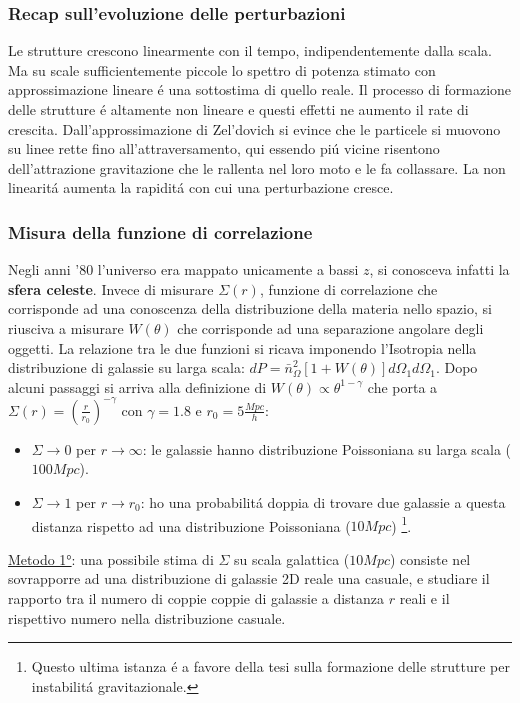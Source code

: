 \documentclass[12pt, a4paper]{article}
\begin{document}
\subsubsection{Recap sull'evoluzione delle perturbazioni}
Le strutture crescono linearmente con il tempo, indipendentemente dalla scala. Ma su scale sufficientemente piccole lo spettro di potenza stimato con approssimazione lineare \'{e} una sottostima di quello reale. Il processo di formazione delle strutture \'{e} altamente non lineare e questi effetti ne aumento il rate di crescita. Dall'approssimazione di Zel'dovich si evince che le particele si muovono su linee rette fino all'attraversamento, qui essendo pi\'{u} vicine risentono dell'attrazione gravitazione che le rallenta nel loro moto e le fa collassare. La non linearit\'{a} aumenta la rapidit\'{a} con cui una perturbazione cresce.
\subsubsection{Misura della funzione di correlazione}
Negli anni '80 l'universo era mappato unicamente a bassi $z$, si conosceva infatti la \textbf{sfera celeste}. Invece di misurare $\Sigma(r)$, funzione di correlazione che corrisponde ad una conoscenza della distribuzione della materia nello spazio, si riusciva a misurare $W(\theta)$ che corrisponde ad una separazione angolare degli oggetti. La relazione tra le due funzioni si ricava imponendo l'Isotropia nella distribuzione di galassie su larga scala: $dP=\bar{n}_{\Omega}^2 [1+W(\theta)] d\Omega_1 d\Omega_1$. Dopo alcuni passaggi si arriva alla definizione di $W(\theta)\propto \theta^{1-\gamma}$ che porta a $\Sigma(r)=(\frac{r}{r_0})^{-\gamma}$ con $\gamma=1.8$ e $r_0=5 \frac{Mpc}{h}$:
\begin{itemize}
\item $\Sigma \rightarrow 0$ per $r\rightarrow \infty$: le galassie hanno distribuzione Poissoniana su larga scala ($100Mpc$).
\item $\Sigma \rightarrow 1$ per $r\rightarrow r_0$: ho una probabilit\'{a} doppia di trovare due galassie a questa distanza rispetto ad una distribuzione Poissoniana ($10Mpc$) \footnote{Questo ultima istanza \'{e} a favore della tesi sulla formazione delle strutture per instabilit\'{a} gravitazionale.}.
\end{itemize}
\underline{Metodo 1°}: una possibile stima di $\Sigma$ su scala galattica ($10Mpc$) consiste nel sovrapporre ad una distribuzione di galassie 2D reale una casuale, e studiare il rapporto tra il numero di coppie coppie di galassie a distanza $r$ reali e il rispettivo numero nella distribuzione casuale.
\end{document}
